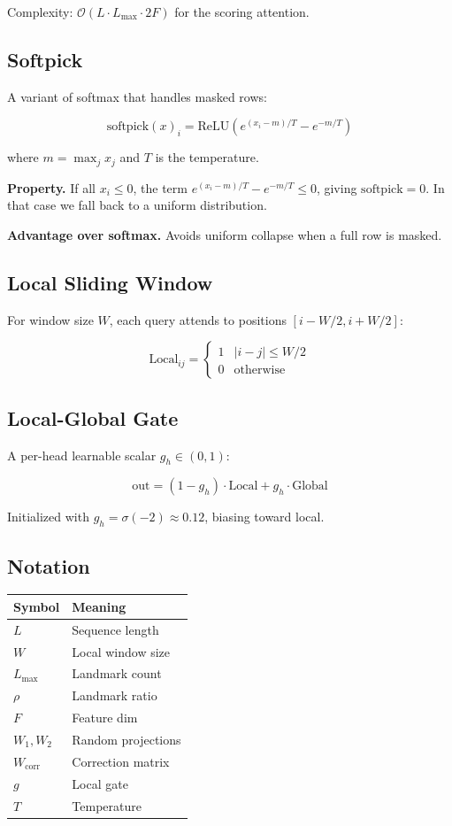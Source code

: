 Complexity: $\mathcal{O}(L \cdot L_\text{max} \cdot 2F)$ for the scoring 
attention.

\subsection{Softpick}

A variant of softmax that handles masked rows:

\[
\text{softpick}(x)_i = \text{ReLU}\!\left(e^{(x_i - m)/T} - e^{-m/T}\right)
\tag{3.7}
\]

where $m = \max_j x_j$ and $T$ is the temperature.

\textbf{Property.} If all $x_i \leq 0$, the term $e^{(x_i - m)/T} - e^{-m/T} \leq 0$, 
giving $\text{softpick} = 0$. In that case we fall back to a uniform 
distribution.

\textbf{Advantage over softmax.} Avoids uniform collapse when a full row is 
masked.

\subsection{Local Sliding Window}

For window size $W$, each query attends to positions $[i - W/2, i + W/2]$:

\[
\text{Local}_{ij} = \begin{cases} 1 & |i - j| \leq W/2 \\ 0 & \text{otherwise} \end{cases}
\tag{3.8}
\]

\subsection{Local-Global Gate}

A per-head learnable scalar $g_h \in (0, 1)$:

\[
\text{out} = (1 - g_h) \cdot \text{Local} + g_h \cdot \text{Global}
\tag{3.9}
\]

Initialized with $g_h = \sigma(-2) \approx 0.12$, biasing toward local.

\subsection{Notation}

\begin{table}[H]
\centering
\small
\begin{tabular}{ll}
\toprule
\textbf{Symbol} & \textbf{Meaning} \\
\midrule
$L$ & Sequence length \\
$W$ & Local window size \\
$L_\text{max}$ & Landmark count \\
$\rho$ & Landmark ratio \\
$F$ & Feature dim \\
$W_1, W_2$ & Random projections \\
$W_\text{corr}$ & Correction matrix \\
$g$ & Local gate \\
$T$ & Temperature \\
\bottomrule
\end{tabular}
\end{table}

